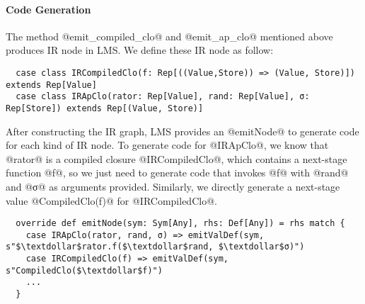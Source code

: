 \paragraph{Code Generation}

The method @emit_compiled_clo@ and @emit_ap_clo@ mentioned above produces IR
node in LMS. We define these IR node as follow: 

\begin{lstlisting}
  case class IRCompiledClo(f: Rep[((Value,Store)) => (Value, Store)]) extends Rep[Value]
  case class IRApClo(rator: Rep[Value], rand: Rep[Value], σ: Rep[Store]) extends Rep[(Value, Store)]
\end{lstlisting}

After constructing the IR graph, LMS provides an @emitNode@ to generate code for
each kind of IR node. To generate code for @IRApClo@, we know that @rator@ is a
compiled closure @IRCompiledClo@, which contains a next-stage function @f@, so
we just need to generate code that invokes @f@ with @rand@ and @σ@ as arguments
provided. Similarly, we directly generate a next-stage value @CompiledClo(f)@
for @IRCompiledClo@.

\begin{lstlisting}
  override def emitNode(sym: Sym[Any], rhs: Def[Any]) = rhs match {
    case IRApClo(rator, rand, σ) => emitValDef(sym, s"$\textdollar$rator.f($\textdollar$rand, $\textdollar$σ)")
    case IRCompiledClo(f) => emitValDef(sym, s"CompiledClo($\textdollar$f)")
    ...
  }
\end{lstlisting}